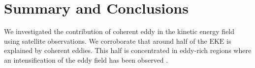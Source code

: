 \documentclass[draft,linenumbers]{agujournal2019}
\newcommand{\EKE}{\textrm{EKE}}
\begin{document}




	\section{Summary and Conclusions}	
	\label{sec:Conclusions}

	We investigated the contribution of coherent eddy in the kinetic energy field using satellite observations. 
	We corroborate that around half of the $\EKE$ is explained by coherent eddies. 
	This half is concentrated in eddy-rich regions where an intensification of the eddy field has been observed \citep{Martinez_Kinetic_2021}. 
\end{document}
